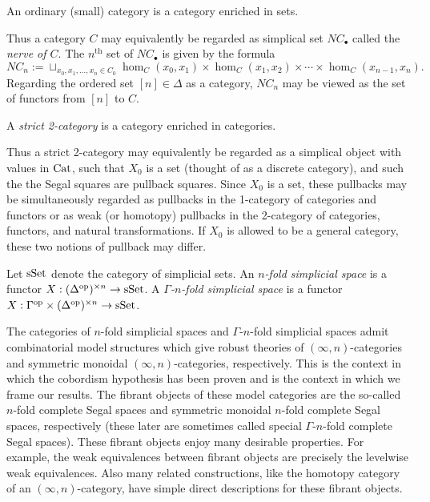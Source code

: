 \documentclass{amsart}
\begin{document}
\begin{example}
	An ordinary (small) category is a category enriched in sets.
\end{example}

Thus a category $C$ may equivalently be regarded as simplical set $NC_\bullet$ called the {\em nerve of $C$}. The $n^\textrm{th}$ set of $NC_{\bullet}$ is given by the formula
\begin{equation*}
	NC_n := \sqcup_{x_0, x_1, \dots, x_n \in C_0} \hom_C(x_0, x_1) \times \hom_C(x_1, x_2) \times \cdots \times \hom_C(x_{n-1}, x_n).
\end{equation*}
Regarding the ordered set $[n] \in \Delta$ as a category, $NC_n$ may be viewed as the set of functors from $[n]$ to $C$. 

\begin{example}
	A {\em strict 2-category} is a category enriched in categories.
\end{example}

Thus a strict 2-category may equivalently be regarded as a simplical object with values in $\mathrm{Cat}$, such that $X_0$ is a set (thought of as a discrete category), and such the the Segal squares are pullback squares. Since $X_0$ is a set, these pullbacks may be simultaneously regarded as pullbacks in the 1-category of categories and functors or as weak (or homotopy) pullbacks in the 2-category of categories, functors, and natural transformations. If $X_0$ is allowed to be a general category, these two notions of pullback may differ. 

\begin{definition}
	Let $\mathrm{sSet}$ denote the category of simplicial sets. An {\em $n$-fold simplicial space} is a functor $X: (\Delta^\textrm{op})^{\times n} \to \mathrm{sSet}$. A {\em $\Gamma$-$n$-fold simplicial space} is a functor $X: \Gamma^\textrm{op} \times (\Delta^\textrm{op})^{\times n} \to \mathrm{sSet}$.
\end{definition}

The categories of $n$-fold simplicial spaces and $\Gamma$-$n$-fold simplicial spaces admit combinatorial model structures which give robust theories of $(\infty, n)$-categories and symmetric monoidal $(\infty, n)$-categories, respectively. This is the context in which the cobordism hypothesis has been proven and is the context in which we frame our results. The fibrant objects of these model categories are the so-called $n$-fold complete Segal spaces and symmetric monoidal $n$-fold complete Segal spaces, respectively (these later are sometimes called special $\Gamma$-$n$-fold complete Segal spaces).
These fibrant objects enjoy many desirable properties. For example, the weak equivalences between fibrant objects are precisely the levelwise weak equivalences. Also many related constructions, like the homotopy category of an $(\infty, n)$-category, have simple direct descriptions for these fibrant objects. 
\end{document}
